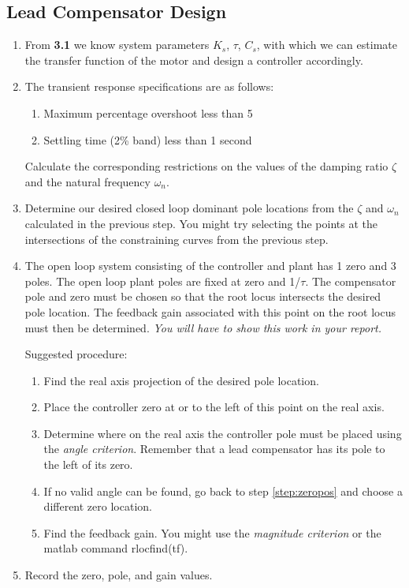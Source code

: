 \documentclass[11pt,a4paper]{article}
\begin{document}
\subsection{Lead Compensator Design} \label{ss:specs}
\begin{enumerate}
\item From \textbf{3.1} we know system parameters $K_{s}$, $\tau$, $C_{s}$, with which we can estimate the transfer function of the motor and design a controller accordingly.

\item The transient response specifications are as follows:
\begin{enumerate}
\item Maximum percentage overshoot less than 5%
\item Settling time (2\% band) less than 1 second
\end{enumerate}

Calculate the corresponding restrictions on the values of the damping ratio $\zeta$ and the natural frequency $\omega_{n}$.


\item Determine our desired closed loop dominant pole locations from the $\zeta$ and $\omega_{n}$ calculated in the previous step. You might try selecting the points at the intersections of the constraining curves from the previous step.

\item  The open loop system consisting of the controller and plant has 1 zero and 3 poles. The open loop plant poles are fixed at zero and 1/$\tau$. The compensator pole and zero must be chosen so that the root locus intersects the desired pole location. The feedback gain associated with this point on the root locus must then be determined. \textit{You will have to show this work in your report.}

Suggested procedure:
\begin{enumerate}
\item Find the real axis projection of the desired pole location.
\item \label{step:zeropos} Place the controller zero at or to the left of this point on the real axis.
\item Determine where on the real axis the controller pole must be placed using the \textit{angle criterion}. Remember that a lead compensator has its pole to the left of its zero.
\item If no valid angle can be found, go back to step \ref{step:zeropos} and choose a different zero location.
\item Find the feedback gain. You might use the \textit{magnitude criterion} or the matlab command rlocfind(tf). 
\end{enumerate}

\item Record the zero, pole, and gain values.
\end{enumerate}
\end{document}
